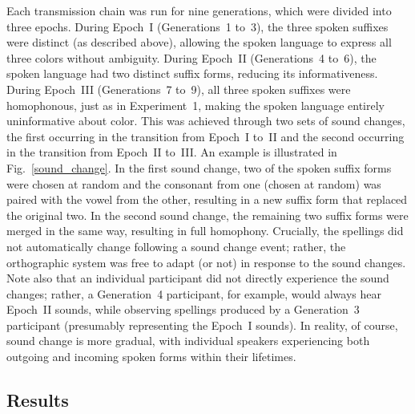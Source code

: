 \documentclass[doc,biblatex]{apa7}
\begin{document}
Each transmission chain was run for nine generations, which were divided into three epochs. During Epoch~I (Generations~1 to~3), the three spoken suffixes were distinct (as described above), allowing the spoken language to express all three colors without ambiguity. During Epoch~II (Generations~4 to~6), the spoken language had two distinct suffix forms, reducing its informativeness. During Epoch~III (Generations~7 to~9), all three spoken suffixes were homophonous, just as in Experiment~1, making the spoken language entirely uninformative about color. This was achieved through two sets of sound changes, the first occurring in the transition from Epoch~I to~II and the second occurring in the transition from Epoch~II to~III. An example is illustrated in Fig.~\ref{sound_change}. In the first sound change, two of the spoken suffix forms were chosen at random and the consonant from one (chosen at random) was paired with the vowel from the other, resulting in a new suffix form that replaced the original two. In the second sound change, the remaining two suffix forms were merged in the same way, resulting in full homophony. Crucially, the spellings did not automatically change following a sound change event; rather, the orthographic system was free to adapt (or not) in response to the sound changes. Note also that an individual participant did not directly experience the sound changes; rather, a Generation~4 participant, for example, would always hear Epoch~II sounds, while observing spellings produced by a Generation~3 participant (presumably representing the Epoch~I sounds). In reality, of course, sound change is more gradual, with individual speakers experiencing both outgoing and incoming spoken forms within their lifetimes.

\subsection{Results}
\end{document}
